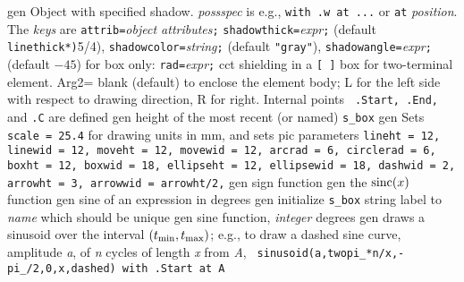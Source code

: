 %
  {gen}%
  { Object with specified shadow.  {\sl possspec} is e.g.,
    {\tt with .w at ...} or {\tt at} {\sl position}.
    The {\sl keys} are
       {\tt attrib=}{\sl object attributes}{\tt ;}
       {\tt shadowthick=}{\sl expr}{\tt ;} (default {\tt linethick*)}5/4),
       {\tt shadowcolor=}{\sl string}{\tt ;} (default {\tt "gray"}),
       {\tt shadowangle=}{\sl expr}{\tt ;} (default $-45$)
       for box only: {\tt rad=}{\sl expr}{\tt ;}%
 }%
 {cct}%
  {shielding in a {\tt [ ]} box for
  two-terminal element. Arg2= blank
    (default) to enclose the element body; L for the left side with
    respect to drawing direction, R for right. Internal points {\tt
    .Start, .End,} and {\tt .C} are defined}%
%
  {gen}%
  {height of the most recent (or named) {\tt s\_box}%
    }%
%
  {gen}%
  {Sets {\tt scale = 25.4} for drawing units in mm, and sets
   pic parameters {\tt lineht = 12, linewid = 12, moveht = 12,
    movewid = 12,
    arcrad = 6, circlerad = 6, boxht = 12, boxwid = 18, ellipseht = 12,
    ellipsewid = 18, dashwid = 2, arrowht = 3, arrowwid = arrowht/2,}}%
%
  {gen}%
  {sign function}%
%
  {gen}%
  {the $\hbox{sinc}(x)$ function}%
%
  {gen}%
  {sine of an expression in degrees}%
%
  {gen}%
  {initialize {\tt s\_box} string label to {\sl name} which should
  be unique
    }%
%
  {gen}%
  {sine function, {\sl integer\/} degrees}%
%
  {gen}%
  {draws a sinusoid over the interval $(t_{\hbox{\scriptsize min}},
  t_{\hbox{\scriptsize max}})$;
   e.g., to draw a dashed sine curve, amplitude {\sl a},
   of {\sl n} cycles of length {\sl x} from {\sl A}, {\tt
   sinusoid(a,twopi\_*n/x,-pi\_/2,0,x,dashed) with .Start at A}}%

